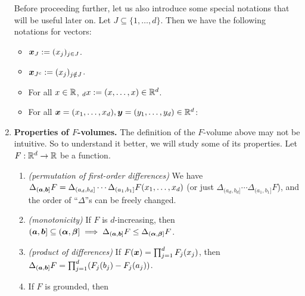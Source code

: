 \begin{enumerate}
Before proceeding further, let us also introduce some special notations that
will be useful later on. Let \(J\subseteq \{1,\dotsc,d\}\). Then we have the
following notations for vectors:
\begin{itemize}
\item \(\bm{x}_{J}:=(x_{j})_{j\in J}\).
\item \(\bm{x}_{J^c}:=(x_j)_{j\notin J}\).
\item For all \(x\in\mathbb{R}\), \({}_{d}x:=(x,\dotsc,x)\in\mathbb{R}^d\).
\item For all \(\bm{x}=(x_1,\dotsc,x_d),\bm{y}=(y_1,\dotsc,y_d)\in\mathbb{R}^d\):
\end{itemize}
\item\label{it:f-vol-prop} \textbf{Properties of \(F\)-volumes.} The definition of the \(F\)-volume
above may not be intuitive. So to understand it better, we will study some of
its properties. Let \(F:\mathbb{R}^d\to\mathbb{R}\) be a function.
\begin{enumerate}
\item\label{it:f-vol-permut} \emph{(permutation of first-order differences)} We
have \(\Delta_{(\bm{a},\bm{b}]}F
=\Delta_{(a_d,b_d]}\dotsb\Delta_{(a_1,b_1]}F(x_1,\dotsc,x_d)\) (or just
\(\Delta_{(a_d,b_d]}\dotsb\Delta_{(a_1,b_1]}F\)), and the order of
``\(\Delta\)''s can be freely changed.
\item\label{it:f-vol-mono} \emph{(monotonicity)} If \(F\) is \(d\)-increasing, then
\((\bm{a},\bm{b}]\subseteq (\bm{\alpha},\bm{\beta}]\implies \Delta_{(\bm{a},\bm{b}]}F
\le\Delta_{(\bm{\alpha},\bm{\beta}]}F\).
\item\label{it:f-vol-prod-diff} \emph{(product of differences)} If \(F(\bm{x})=\prod_{j=1}^{d}F_j(x_j)\), then
\(\Delta_{(\bm{a},\bm{b}]}F=\prod_{j=1}^{d}(F_{j}(b_j)-F_{j}(a_j))\).
\item\label{it:ground-lim} If \(F\) is grounded, then

\end{enumerate}
\end{enumerate}
